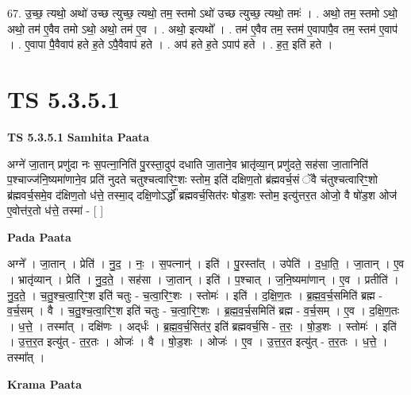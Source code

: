 \documentclass[17pt]{extarticle}
\begin{document}
67. उ॒च्छ॒ त्यथो॒ अथो॑ उच्छ त्युच्छ॒ त्यथो॒ तम॒ स्तमो ऽथो॑ उच्छ त्युच्छ॒ त्यथो॒ तमः॑ । . अथो॒ तम॒ स्तमो ऽथो॒ अथो॒ तम॑ ए॒वैव तमो ऽथो॒ अथो॒ तम॑ ए॒व । . अथो॒ इत्यथो᳚ । . तम॑ ए॒वैव तम॒ स्तम॑ ए॒वापापै॒व तम॒ स्तम॑ ए॒वाप॑ । . ए॒वापा पै॒वैवाप॑ हते ह॒ते ऽपै॒वैवाप॑ हते । . अप॑ हते ह॒ते ऽपाप॑ हते । . ह॒त॒ इति॑ हते । \newline
\pagebreak
{}

\section{ TS 5.3.5.1 }

\textbf{TS 5.3.5.1 } \newline
\textbf{Samhita Paata} \newline

अग्ने॑ जा॒तान् प्रणु॑दा नः स॒पत्ना॒निति॑ पु॒रस्ता॒दुप॑ दधाति जा॒ताने॒व भ्रातृ॑व्या॒न् प्रणु॑दते॒ सह॑सा जा॒तानिति॑ प॒श्चाज्ज॑नि॒ष्यमा॑णाने॒व प्रति॑ नुदते चतुश्चत्वारिꣳ॒॒शः स्तोम॒ इति॑ दक्षिण॒तो ब्र॑ह्मवर्च॒सं ॅवै च॑तुश्चत्वारिꣳ॒॒शो ब्र॑ह्मवर्च॒समे॒व द॑क्षिण॒तो ध॑त्ते॒ तस्मा॒द् दक्षि॒णोऽर्द्धो᳚ ब्रह्मवर्च॒सित॑रः षोड॒शः स्तोम॒ इत्यु॑त्तर॒त ओजो॒ वै षो॑ड॒श ओज॑ ए॒वोत्त॑र॒तो ध॑त्ते॒ तस्मा॑ - [  ] \newline

\textbf{Pada Paata} \newline

अग्ने᳚ । जा॒तान् । प्रेति॑ । नु॒द॒ । नः॒ । स॒पत्नान्॑ । इति॑ । पु॒रस्ता᳚त् । उपेति॑ । द॒धा॒ति॒ । जा॒तान् । ए॒व । भ्रातृ॑व्यान् । प्रेति॑ । नु॒द॒ते॒ । सह॑सा । जा॒तान् । इति॑ । प॒श्चात् । ज॒नि॒ष्यमा॑णान् । ए॒व । प्रतीति॑ । नु॒द॒ते॒ । च॒तु॒श्च॒त्वा॒रिꣳ॒॒श इति॑ चतुः - च॒त्वा॒रिꣳ॒॒शः । स्तोमः॑ । इति॑ । द॒क्षि॒ण॒तः । ब्र॒ह्म॒व॒र्च॒समिति॑ ब्रह्म - व॒र्च॒सम् । वै । च॒तु॒श्च॒त्वा॒रिꣳ॒॒श इति॑ चतुः - च॒त्वा॒रिꣳ॒॒शः । ब्र॒ह्म॒व॒र्च॒समिति॑ ब्रह्म - व॒र्च॒सम् । ए॒व । द॒क्षि॒ण॒तः । ध॒त्ते॒ । तस्मा᳚त् । दक्षि॑णः । अद्‌र्धः॑ । ब्र॒ह्म॒व॒र्च॒सित॑र॒ इति॑ ब्रह्मवर्च॒सि - त॒रः॒ । षो॒ड॒शः । स्तोमः॑ । इति॑ । उ॒त्त॒र॒त इत्यु॑त् - त॒र॒तः । ओजः॑ । वै । षो॒ड॒शः । ओजः॑ । ए॒व । उ॒त्त॒र॒त इत्यु॑त् - त॒र॒तः । ध॒त्ते॒ । तस्मा᳚त् ।  \newline


\textbf{Krama Paata} \newline
\end{document}
